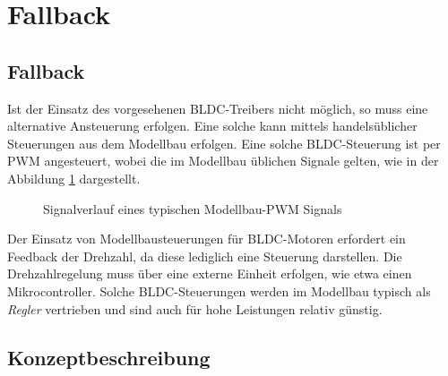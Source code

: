 \ifSTANDALONE
\section{Fallback}
\fi
\ifEMBED
\subsection{Fallback}
\fi
Ist der Einsatz des vorgesehenen BLDC-Treibers nicht möglich, so muss eine
alternative Ansteuerung erfolgen. Eine solche kann mittels handelsüblicher
Steuerungen aus dem Modellbau erfolgen. Eine solche BLDC-Steuerung ist per
PWM angesteuert, wobei die im Modellbau üblichen Signale gelten, wie in der
Abbildung \ref{fig:rc-pwm} dargestellt.

\begin{figure}[h!]
	\centering
	\caption{Signalverlauf eines typischen Modellbau-PWM Signals}
	\label{fig:rc-pwm}
\end{figure}

Der Einsatz von Modellbausteuerungen für BLDC-Motoren erfordert ein
Feedback der Drehzahl, da diese lediglich eine Steuerung darstellen. Die
Drehzahlregelung muss über eine externe Einheit erfolgen, wie etwa einen
Mikrocontroller. Solche BLDC-Steuerungen werden im Modellbau typisch als
\emph{Regler} vertrieben und sind auch für hohe Leistungen relativ günstig.

\ifSTANDALONE
\subsection{Konzeptbeschreibung}
\fi
\ifEMBED
